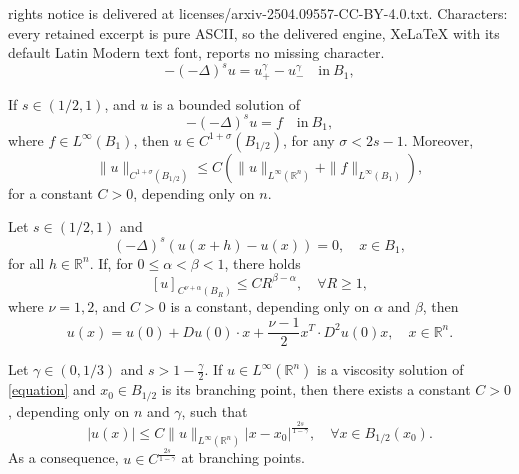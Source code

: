 \documentclass[10pt,a4paper]{amsart}
\newcommand{\R}{\mathbb{R}}
\begin{document}
rights notice is delivered at licenses/arxiv-2504.09557-CC-BY-4.0.txt. Characters: every retained excerpt is pure ASCII, so the delivered engine, XeLaTeX with its default Latin Modern text font, reports no missing character.
\begin{equation}\label{equation}
   -(-\Delta)^su=u_+^\gamma-u_-^\gamma \quad \textrm{in} \ B_1,
\end{equation}

\begin{theorem}\label{CNtheorem}
If $s\in\left(1/2,1\right)$, and $u$ is a bounded solution of
$$
-(-\Delta)^su=f \quad \textrm{in} \ B_1,
$$
where $f\in L^\infty(B_1)$, then $u\in C^{1+\sigma}(B_{1/2})$, for any $\sigma<2s-1$. Moreover,
$$
\|u\|_{C^{1+\sigma}(B_{1/2})}\le C\left(\|u\|_{L^\infty(\R^n)}+\|f\|_{L^\infty(B_1)}\right),
$$
for a constant $C>0$, depending only on $n$.
\end{theorem}

\begin{theorem}\label{SeminormGrowth}
    Let $s\in(1/2,1)$ and
    \begin{equation}\label{Zeroquotient}
    (-\Delta)^s \left( u(x+h)-u(x) \right)=0, \quad x\in B_1,  
    \end{equation}    
    for all $h\in\R^n$. If, for $0\le\alpha<\beta<1$, there holds
    \begin{equation}\label{crescimento da norma}
    [u]_{C^{\nu+\alpha}(B_R)}\le CR^{\beta-\alpha},\quad \forall R\ge1,
    \end{equation}
    where $\nu=1,2$, and $C>0$ is a constant, depending only on $\alpha$ and $\beta$, then 
    $$
    u(x)=u(0)+Du(0) \cdot x+ \frac{\nu-1}{2} x^T \cdot D^2u(0) x, \quad x\in\R^n.
    $$
\end{theorem}

\begin{theorem}\label{main result 1}
    Let $\gamma\in(0,1/3)$ and $s>1-\frac{\gamma}{2}$. If $u\in L^\infty(\R^n)$ is a viscosity solution of \eqref{equation} and $x_0\in B_{1/2}$ is its branching point, then there exists a constant $C>0$, depending only on $n$ and $\gamma$, such that
\begin{equation}\label{growth estimate 2025}  
    |u(x)|\le C\|u\|_{L^\infty(\R^n)}|x-x_0|^{\frac{2s}{1-\gamma}}, \quad \forall x \in B_{1/2}(x_0).      
\end{equation} 
As a consequence, $u\in C^{\frac{2s}{1-\gamma}}$ at branching points.
\end{theorem}
\end{document}
